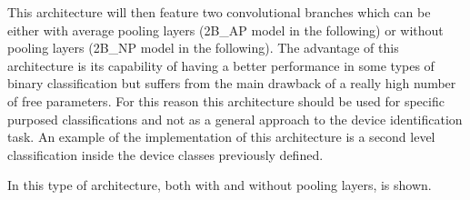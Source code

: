 This architecture will then feature two convolutional branches which can be either with average pooling layers (2B\_AP model in the following) or without pooling layers (2B\_NP model in the following). The advantage of this architecture is its capability of having a better performance in some types of binary classification but suffers from the main drawback of a really high number of free parameters. For this reason this architecture should be used for specific purposed classifications and not as a general approach to the device identification task. An example of the implementation of this architecture is a second level classification inside the device classes previously defined. 

In  this type of architecture, both with and without pooling layers, is shown.


